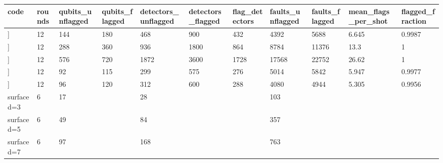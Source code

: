 \begin{tabular}{lllllllllll}
\hline
code & rounds & qubits\_unflagged & qubits\_flagged & detectors\_unflagged & detectors\_flagged & flag\_detectors & faults\_unflagged & faults\_flagged & mean\_flags\_per\_shot & flagged\_fraction \\
\hline
[[72, 12, 6]] & 12 & 144 & 180 & 468 & 900 & 432 & 4392 & 5688 & 6.645 & 0.9987 \\
[[144, 12, 12]] & 12 & 288 & 360 & 936 & 1800 & 864 & 8784 & 11376 & 13.3 & 1 \\
[[288, 12, 18]] & 12 & 576 & 720 & 1872 & 3600 & 1728 & 17568 & 22752 & 26.62 & 1 \\
[[46, 2, 9]] & 12 & 92 & 115 & 299 & 575 & 276 & 5014 & 5842 & 5.947 & 0.9977 \\
[[48, 6, 8]] & 12 & 96 & 120 & 312 & 600 & 288 & 4080 & 4944 & 5.305 & 0.9956 \\
surface d=3 & 6 & 17 &  & 28 &  &  & 103 &  &  &  \\
surface d=5 & 6 & 49 &  & 84 &  &  & 357 &  &  &  \\
surface d=7 & 6 & 97 &  & 168 &  &  & 763 &  &  &  \\
\hline
\end{tabular}

